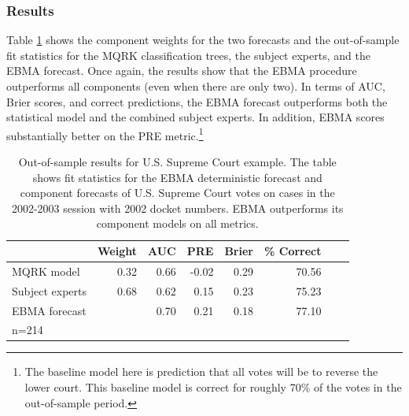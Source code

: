 \documentclass[pdftex,12pt,fullpage,oneside]{amsart}
\begin{document}
 \subsubsection{Results}

 Table \ref{SC-Res} shows the component weights for the two forecasts
 and the out-of-sample fit statistics for the MQRK classification
 trees, the subject experts, and the EBMA forecast. Once again, the
 results show that the EBMA procedure outperforms all components (even
 when there are only two).  In terms of AUC, Brier scores, and correct
 predictions, the EBMA forecast outperforms both the statistical model
 and the combined subject experts.  In addition, EBMA scores
 substantially better on the PRE metric.\footnote{The baseline model
   here is prediction that all votes will be to reverse the lower
   court.  This baseline model is correct for roughly 70\% of the
   votes in the out-of-sample period.}

\begin{table}[ht]
  \caption{\footnotesize Out-of-sample results for U.S. Supreme Court
    example.  The table shows fit statistics for the EBMA deterministic
    forecast and component forecasts of U.S. Supreme Court votes on
    cases in the 2002-2003 session with 2002 docket numbers.   EBMA
    outperforms its component models on all metrics. }
\label{SC-Res} \small
\begin{center}
\begin{tabular}{lrrrrrrr}
\toprule
 & Weight & AUC & PRE & Brier & \% Correct   \\ 
\midrule
MQRK model& 0.32  & 0.66 & -0.02 & 0.29 & 70.56   \\ 
Subject experts & 0.68 & 0.62 & 0.15 & 0.23 & 75.23  \\ 
EBMA forecast&  & 0.70 & 0.21 & 0.18 & 77.10  \\ 
\bottomrule
n=214 
\end{tabular}
\end{center}
\end{table}


\end{document}
